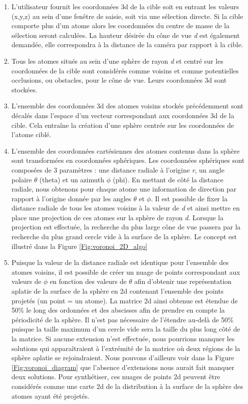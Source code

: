 \begin{enumerate}
	\item L'utilisateur fournit les coordonnées 3d de la cible soit en entrant les valeurs (x,y,z) au sein d'une fenêtre de saisie, soit via une sélection directe. Si la cible comporte plus d'un atome alors les coordonnées du centre de masse de la sélection seront calculées. La hauteur désirée du cône de vue \textit{d} est également demandée, elle correspondra à la distance de la caméra par rapport à la cible.
	\item Tous les atomes situés au sein d'une sphère de rayon \textit{d} et centré sur les coordonnées de la cible sont considérés comme voisins et comme potentielles occlusions, ou obstacles, pour le cône de vue. Leurs coordonnées 3d sont stockées.
	\item L'ensemble des coordonnées 3d des atomes voisins stockés précédemment sont décalés dans l'espace d'un vecteur correspondant aux coordonnées 3d de la cible. Cela entraîne la création d'une sphère centrée sur les coordonnées de l'atome ciblé.
	\item L'ensemble des coordonnées cartésiennes des atomes contenus dans la sphère sont transformées en coordonnées sphériques. Les coordonnées sphériques sont composées de 3 paramètres : une distance radiale à l'origine \textit{r}, un angle polaire $\theta$ (theta) et un azimuth $\phi$ (phi). En mettant de côté la distance radiale, nous obtenons pour chaque atome une information de direction par rapport à l'origine donnée par les angles $\theta$ et $\phi$. Il est possible de fixer la distance radiale de tous les atomes voisins à la valeur de \textit{d} et ainsi mettre en place une projection de ces atomes sur la sphère de rayon \textit{d}. Lorsque la projection est effectuée, la recherche du plus large cône de vue passera par la recherche du plus grand cercle vide à la surface de la sphère. Le concept est illustré dans la Figure \ref{Fig:voronoi_2D_algo}
	\item Puisque la valeur de la distance radiale est identique pour l'ensemble des atomes voisins, il est possible de créer un nuage de points correspondant aux valeurs de $\phi$ en fonction des valeurs de $\theta$ afin d'obtenir une représentation aplatie de la surface de la sphère en 2d contenant l'ensemble des points projetés (un point = un atome). La matrice 2d ainsi obtenue est étendue de 50\% le long des ordonnées et des abscisses afin de prendre en compte la périodicité de la sphère. Il n'est pas nécessaire de l'étendre au-delà de 50\% puisque la taille maximum d'un cercle vide sera la taille du plus long côté de la matrice. Si aucune extension n'est effectuée, nous pourrions manquer les solutions qui apparaîtraient à l'extrémité de la matrice où deux régions de la sphère aplatie se rejoindraient. Nous pouvons d'ailleurs voir dans la Figure \ref{Fig:voronoi_diagram} que l'absence d'extensions nous aurait fait manquer deux solutions. Pour synthétiser, ces nuages de points 2d peuvent être considérés comme une carte 2d de la distribution à la surface de la sphère des atomes ayant été projetés.

\end{enumerate}
